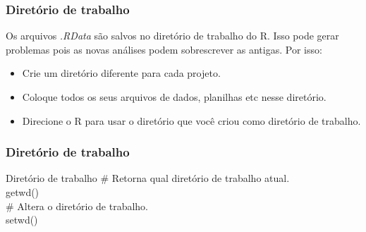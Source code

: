 \documentclass[handout]{beamer}
\begin{document}
\begin{frame}
  \frametitle{Diretório de trabalho}
  
    Os arquivos \textit{.RData} são salvos no diretório de trabalho do R. Isso pode gerar problemas pois as novas análises podem sobrescrever as antigas. Por isso:
    \begin{itemize}
      \item <1-3>Crie um diretório diferente para cada projeto.
      \item <2-3> Coloque todos os seus arquivos de dados, planilhas etc nesse diretório.
     \item<3> Direcione o R para usar o diretório que você criou como diretório de trabalho.
    \end{itemize}
\end{frame}
\begin{frame}
  \frametitle{Diretório de trabalho}
  \begin{block}{Diretório de trabalho}
    \# Retorna qual diretório de trabalho atual.\\
     getwd() \\
    \# Altera o diretório de trabalho.\\
     setwd()
  \end{block}
\end{frame}
\end{document}
